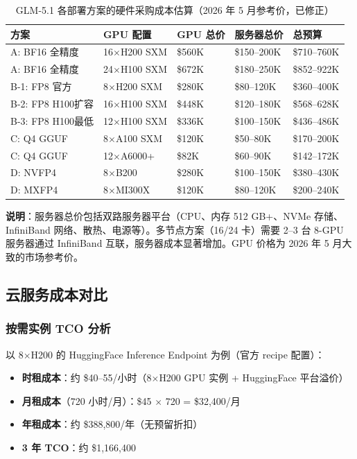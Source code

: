 \documentclass[UTF8,a4paper,10pt,oneside]{ctexart}
\begin{document}
\begin{table}[htbp]
\centering
\caption{GLM-5.1 各部署方案的硬件采购成本估算（2026 年 5 月参考价，已修正）}
\begin{tabular}{p{3.5cm}p{1.8cm}p{2.3cm}p{3cm}p{2cm}}
\hline
\textbf{方案} & \textbf{GPU 配置} & \textbf{GPU 总价} & \textbf{服务器总价} & \textbf{总预算} \\
\hline
A: BF16 全精度 & 16$\times$H200 SXM & \$560K & \$150--200K & \$710--760K \\
A: BF16 全精度 & 24$\times$H100 SXM & \$672K & \$180--250K & \$852--922K \\
B-1: FP8 官方 & 8$\times$H200 SXM & \$280K & \$80--120K & \$360--400K \\
B-2: FP8 H100扩容 & 16$\times$H100 SXM & \$448K & \$120--180K & \$568--628K \\
B-3: FP8 H100最低 & 12$\times$H100 SXM & \$336K & \$100--150K & \$436--486K \\
C: Q4 GGUF & 8$\times$A100 SXM & \$120K & \$50--80K & \$170--200K \\
C: Q4 GGUF & 12$\times$A6000+ & \$82K & \$60--90K & \$142--172K \\
D: NVFP4 & 8$\times$B200 & \$280K & \$100--150K & \$380--430K \\
D: MXFP4 & 8$\times$MI300X & \$120K & \$80--120K & \$200--240K \\
\hline
\end{tabular}
\end{table}

\textbf{说明}：服务器总价包括双路服务器平台（CPU、内存 512 GB+、NVMe 存储、InfiniBand 网络、散热、电源等）。多节点方案（16/24 卡）需要 2--3 台 8-GPU 服务器通过 InfiniBand 互联，服务器成本显著增加。GPU 价格为 2026 年 5 月大致的市场参考价。

\subsection{云服务成本对比}

\subsubsection{按需实例 TCO 分析}

以 8$\times$H200 的 HuggingFace Inference Endpoint 为例（官方 recipe 配置）：

\begin{itemize}
    \item \textbf{时租成本}：约 \$40--55/小时（8$\times$H200 GPU 实例 + HuggingFace 平台溢价）
    \item \textbf{月租成本}（720 小时/月）：\$45 $\times$ 720 = \$32,400/月
    \item \textbf{年租成本}：约 \$388,800/年（无预留折扣）
    \item \textbf{3 年 TCO}：约 \$1,166,400
\end{itemize}
\end{document}
